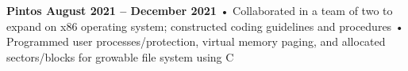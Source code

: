 \documentclass[../main.tex]{subfiles}
\begin{document}
%
\noindent\textbf{{\fontsize{\textFontSize}{\textFontBox}\selectfont Pintos \hfill August 2021 – December 2021}}
\vspace{-0.0mm}\newline
%
%
{\fontsize{\textFontSize}{\textFontBox}\selectfont • \hspace{1mm} Collaborated in a team of two to expand on x86 operating system; constructed coding guidelines and procedures }\newline
{\fontsize{\textFontSize}{\textFontBox}\selectfont • \hspace{1mm} Programmed user processes/protection, virtual memory paging, and allocated sectors/blocks for growable file system using C }\newline
%
%
\end{document}
